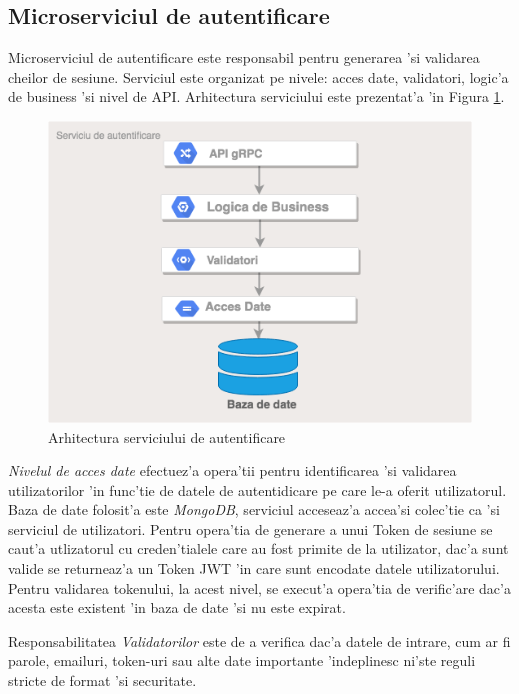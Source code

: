 \documentclass[12pt,a4paper,twoside]{report}
\begin{document}
\subsection{Microserviciul de autentificare}  \label{s_auth}
Microserviciul de autentificare este responsabil pentru generarea 'si validarea cheilor de sesiune. Serviciul este organizat pe nivele: acces date, validatori, logic'a de business 'si nivel de API. Arhitectura serviciului este prezentat'a 'in Figura \ref{auth_arch}.
\begin{figure}[H]
\begin{center}
\advance\leftskip-3cm
\advance\rightskip-3cm
\includegraphics[keepaspectratio=true,scale=0.5]{img/auth_arch.png}
\caption{Arhitectura serviciului de autentificare}
\label{auth_arch}
\end{center}
\end{figure}
\textit{Nivelul de acces date} efectuez'a opera'tii pentru identificarea 'si validarea utilizatorilor 'in func'tie de datele de autentidicare pe care le-a oferit utilizatorul. Baza de date folosit'a este \textit{MongoDB}, serviciul acceseaz'a  accea'si colec'tie ca 'si serviciul de utilizatori. Pentru opera'tia de generare a unui Token de sesiune se caut'a utlizatorul cu creden'tialele care au fost primite de la utilizator, dac'a sunt valide se returneaz'a un Token JWT 'in care sunt encodate datele utilizatorului. Pentru validarea tokenului, la acest nivel, se execut'a opera'tia de verific'are dac'a acesta este existent 'in baza de date 'si nu este expirat. 

Responsabilitatea \textit{Validatorilor} este de a verifica dac'a datele de intrare, cum ar fi parole, emailuri, token-uri sau alte date importante 'indeplinesc ni'ste reguli stricte de format 'si securitate. 
\end{document}
